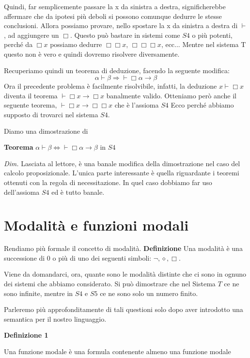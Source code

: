 \documentclass[a4paper, 12pt]{article}
\begin{document}
Quindi, far semplicemente passare la x da sinistra a destra, significherebbe affermare che
da ipotesi più deboli si possono comunque dedurre le stesse conclusioni. Allora possiamo provare,
nello spostare la x da sinistra a destra di $\vdash$, ad aggiungere un $\Box$.
Questo può bastare in sistemi come $S4$ o più potenti, perché da $\Box x$ possiamo dedurre
$\Box \Box x$, $\Box \Box \Box x$, ecc...
Mentre nel sistema T questo non è vero e quindi dovremo risolvere diversamente.

Recuperiamo quindi un teorema di deduzione, facendo la seguente modifica:
$$\alpha \vdash \beta \Rightarrow \vdash \Box \alpha \rightarrow \beta$$
Ora il precedente problema è facilmente risolvibile, infatti, la deduzione $x \vdash \Box x$
diventa il teorema $\vdash \Box x \rightarrow \Box x$ banalmente valido.
Otteniamo però anche il seguente teorema, $\vdash \Box x \rightarrow \Box \Box x$ che è l'assioma $S4$
Ecco perché abbiamo supposto di trovarci nel sistema $S4$.

Diamo una dimostrazione di

\begin{flushleft}
\textbf{Teorema}
$\alpha \vdash \beta \Leftrightarrow \vdash \Box \alpha \rightarrow \beta$ in $S4$

\textit{Dim.}
Lasciata al lettore, è una banale modifica della dimostrazione nel caso del calcolo proposizionale.
L'unica parte interessante è quella riguardante i teoremi ottenuti con la regola di necessitazione.
In quel caso dobbiamo far uso dell'assioma $S4$ ed è tutto banale.
\end{flushleft}



\section{Modalità e funzioni modali}
Rendiamo più formale il concetto di modalità.
\textbf{Definizione}
Una modalità è una successione di 0 o più di uno dei seguenti simboli: $\neg,\diamond,\Box$.

Viene da domandarci, ora, quante sono le modalità distinte che ci sono in ognuno dei sistemi che abbiamo considerato.
Si può dimostrare che nel Sistema $T$ ce ne sono infinite,
mentre in $S4$ e $S5$ ce ne sono solo un numero finito.

Parleremo più approfonditamente di tali questioni solo dopo aver introdotto una semantica
per il nostro linguaggio.

\begin{flushleft}
\textbf{Definizione 1}

Una funzione modale è una formula contenente almeno una funzione modale
\end{flushleft}
\end{document}
